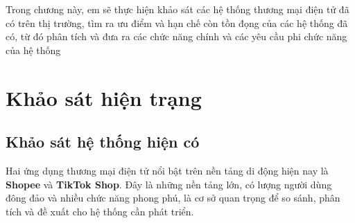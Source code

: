 \documentclass[../DoAn.tex]{subfiles}
\begin{document}

Trong chương này, em sẽ thực hiện khảo sát các hệ thống thương mại điện tử đã có trên thị trường, tìm ra ưu điểm và hạn chế còn tồn đọng của các hệ thống đã có, từ đó phân tích và đưa ra các chức năng chính và các yêu cầu phi chức năng của hệ thống

\section{Khảo sát hiện trạng}
\label{section:2.1}


\subsection{Khảo sát hệ thống hiện có}
\label{subsection:2.1.1}
Hai ứng dụng thương mại điện tử nổi bật trên nền tảng di động hiện nay là \textbf{Shopee} và \textbf{TikTok Shop}. Đây là những nền tảng lớn, có lượng người dùng đông đảo và nhiều chức năng phong phú, là cơ sở quan trọng để so sánh, phân tích và đề xuất cho hệ thống cần phát triển.
\end{document}
